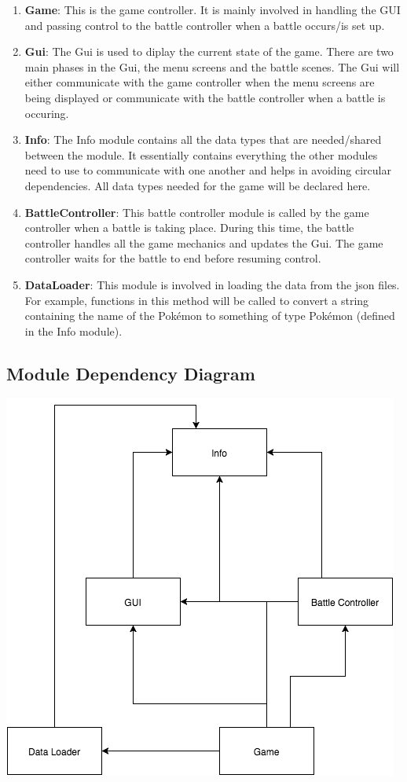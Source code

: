\documentclass{scrreprt}
\begin{document}
\begin{enumerate}
	\item \textbf{Game}: This is the game controller. It is mainly involved in handling the GUI and passing control to the battle controller when a battle occurs/is set up.
	\item \textbf{Gui}: The Gui is used to diplay the current state of the game. There are two main phases in the Gui, the menu screens and the battle scenes. The Gui will either communicate with the game controller when the menu screens are being displayed or communicate with the battle controller when a battle is occuring.
	\item \textbf{Info}: The Info module contains all the data types that are needed/shared between the module. It essentially contains everything the other modules need to use to communicate with one another and helps in avoiding circular dependencies. All data types needed for the game will be declared here.
	\item \textbf{BattleController}: This battle controller module is called by the game controller when a battle is taking place. During this time, the battle controller handles all the game mechanics and updates the Gui. The game controller waits for the battle to end before resuming control.
	\item \textbf{DataLoader}: This module is involved in loading the data from the json files. For example, functions in this method will be called to convert a string containing the name of the Pok\'emon to something of type Pok\'emon (defined in the Info module).
	
\end{enumerate}

\subsection{Module Dependency Diagram}
\includegraphics[scale=0.75]{MDD.png}
\end{document}
